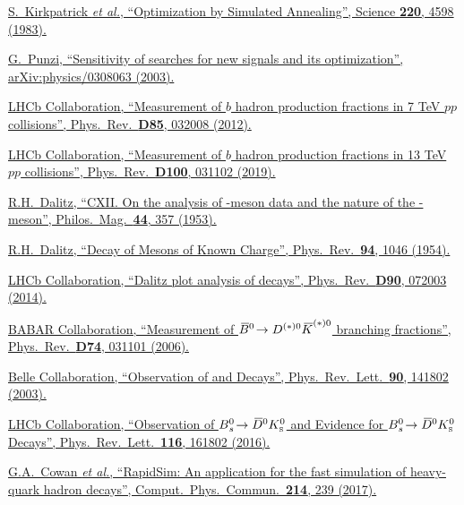 {\begin{thebibliography}{xxx}
	\href{https://doi.org/10.1126/science.220.4598.671}{S.~Kirkpatrick \textit{et al.}, \enquote{Optimization by Simulated Annealing}, Science \textbf{220}, 4598 (1983).}

	\href{https://arxiv.org/abs/physics/0308063}{G.~Punzi, \enquote{Sensitivity of searches for new signals and its optimization}, arXiv:physics/0308063 (2003).}

	\href{https://doi.org/10.1103/PhysRevD.85.032008}{LHCb Collaboration, \enquote{Measurement of $b$ hadron production fractions in 7 TeV $pp$ collisions}, Phys.\ Rev.\ \textbf{D85}, 032008 (2012).}

	\href{https://doi.org/10.1103/PhysRevD.100.031102}{LHCb Collaboration, \enquote{Measurement of $b$ hadron production fractions in 13 TeV $pp$ collisions}, Phys.\ Rev.\ \textbf{D100}, 031102 (2019).}

	\href{https://doi.org/10.1080/14786441008520365}{R.H.~Dalitz, \enquote{CXII. On the analysis of \Ptau-meson data and the nature of the \Ptau-meson}, Philos.\ Mag.\ \textbf{44}, 357 (1953).}

	\href{https://doi.org/10.1103/PhysRev.94.1046}{R.H.~Dalitz, \enquote{Decay of \Ptau Mesons of Known Charge}, Phys.\ Rev.\ \textbf{94}, 1046 (1954).}

	\href{https://doi.org/10.1103/PhysRevD.90.072003}{LHCb Collaboration, \enquote{Dalitz plot analysis of \decay{\Bsb}{\Dzb\Km\pip} decays}, Phys.\ Rev.\ \textbf{D90}, 072003 (2014).}

	\href{https://doi.org/10.1103/PhysRevD.74.031101}{BABAR Collaboration, \enquote{Measurement of ${{\kern 0.18em\overline{\kern -0.18em B}{}}{}^0}\!\rightarrow D^{(*)0}{{\kern 0.2em\overline{\kern -0.2em K}{}}}^{(*)0}$ branching fractions}, Phys.\ Rev.\ \textbf{D74}, 031101 (2006).}

	\href{https://doi.org/10.1103/PhysRevLett.90.141802}{Belle Collaboration, \enquote{Observation of \decay{\Bdb}{\Dz\Kzb} and \decay{\Bdb}{\Dz\Kstarzb} Decays}, Phys.\ Rev.\ Lett.\ \textbf{90}, 141802 (2003).}

	\href{https://doi.org/10.1103/PhysRevLett.116.161802}{LHCb Collaboration, \enquote{Observation of ${B}{}^0_{s}\!\rightarrow {\ensuremath{{\kern 0.2em\overline{\kern -0.2em D}{}}{}^0}}{\ensuremath{K}}^0_{\mathrm{\scriptscriptstyle S}}$ and Evidence for ${B}{}^0_{s}\!\rightarrow {\ensuremath{{\kern 0.2em\overline{\kern -0.2em D}{}}{}^0}}{\ensuremath{K}}^0_{\mathrm{\scriptscriptstyle S}}$ Decays}, Phys.\ Rev.\ Lett.\ \textbf{116}, 161802 (2016).}

	\href{https://doi.org/10.1016/j.cpc.2017.01.029}{G.A.~Cowan \textit{et al.}, \enquote{RapidSim: An application for the fast simulation of heavy-quark hadron decays}, Comput.\ Phys.\ Commun.\ \textbf{214}, 239 (2017).}


\end{thebibliography}}
